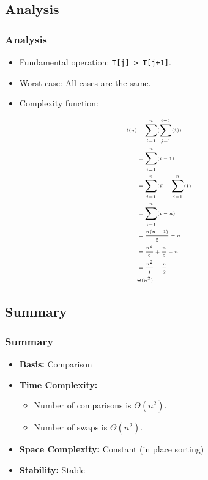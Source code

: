 \documentclass{beamer}
\begin{document}
\subsection{Analysis}
\begin{frame}
\frametitle{Analysis}
\begin{itemize}
\item Fundamental operation: \texttt{T[j] > T[j+1]}.
\item Worst case: All cases are the same.
\item Complexity function:
\end{itemize}
\begin{equation}
\tiny
\begin{split}
t(n) & = \displaystyle\sum_{i=1}^{n}(\displaystyle\sum_{j=1}^{i-1}(1))\\
&= \displaystyle\sum_{i=1}^{n}(i-1)\\
&= \displaystyle\sum_{i=1}^{n}(i)-\displaystyle\sum_{i=1}^n(1)\\
&= \displaystyle\sum_{i=1}^{n}(i-n)\\
&= \frac{n(n-1)}{2}-n\\
&= \frac{n^2}{2} + \frac{n}{2} - n\\
&= \frac{n^2}{1} - \frac{n}{2}\\
&\Theta(n^2)
\end{split}
\end{equation}
\end{frame}
\subsection{Summary}
\begin{frame}
\frametitle{Summary}
\begin{itemize}
\item \textbf{Basis:} Comparison
\item \textbf{Time Complexity:}
\begin{itemize}
\item Number of comparisons is $\Theta(n^2)$.
\item Number of swaps is $\Theta(n^2)$.
\end{itemize}
\item \textbf{Space Complexity:} Constant (in place sorting)
\item \textbf{Stability:} Stable
\end{itemize}
\end{frame}
\end{document}
